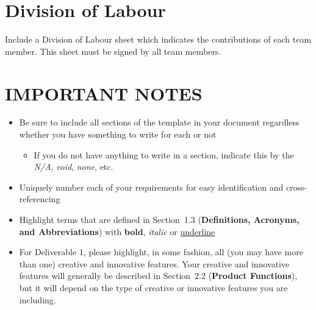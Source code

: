 \documentclass[]{article}
\begin{document}


\appendix
\section{Division of Labour}
\label{sec:division_of_labour}
Include a Division of Labour sheet which indicates the contributions of each
team member. This sheet must be signed by all team members.

\newpage
\section*{IMPORTANT NOTES}
\begin{itemize}
	\item Be sure to include all sections of the template in your document
regardless whether you have something to write for each or not
	\begin{itemize}
		\item If you do not have anything to write in a section, indicate this by the
\emph{N/A}, \emph{void}, \emph{none}, etc.
	\end{itemize}
	\item Uniquely number each of your requirements for easy identification and
cross-referencing
	\item Highlight terms that are defined in Section~1.3 (\textbf{Definitions,
Acronyms, and Abbreviations}) with \textbf{bold}, \emph{italic} or
\underline{underline}
	\item For Deliverable 1, please highlight, in some fashion, all (you may have
more than one) creative and innovative features. Your creative and innovative
features will generally be described in Section~2.2 (\textbf{Product
Functions}), but it will depend on the type of creative or innovative features
you are including.
\end{itemize}
\end{document}
